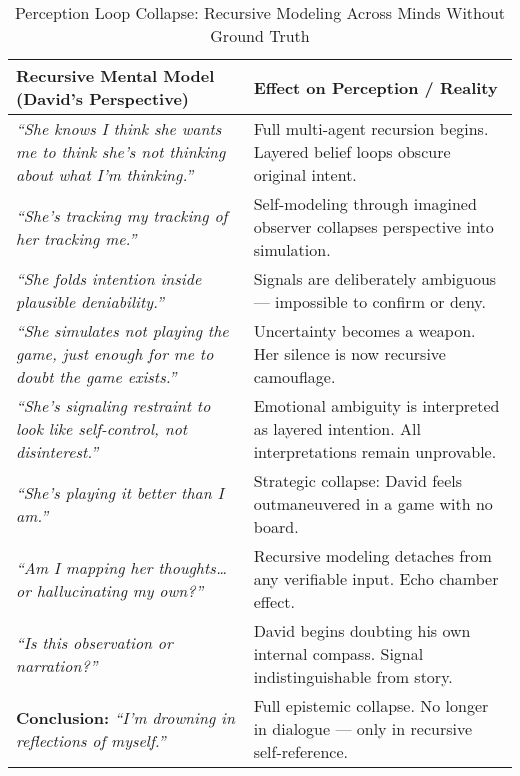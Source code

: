 \begin{table}[H]
  \centering
  \renewcommand{\arraystretch}{1.6}
  \begin{tabular}{>{\raggedright\arraybackslash}p{7cm} 
                  >{\raggedright\arraybackslash}p{7cm}}
  \toprule
  \textbf{Recursive Mental Model (David’s Perspective)} 
  & \textbf{Effect on Perception / Reality} \\
  \midrule

  \textit{“She knows I think she wants me to think she’s not thinking about what I’m thinking.”} 
  & Full multi-agent recursion begins. Layered belief loops obscure original intent. \\

  \textit{“She’s tracking my tracking of her tracking me.”} 
  & Self-modeling through imagined observer collapses perspective into simulation. \\

  \textit{“She folds intention inside plausible deniability.”} 
  & Signals are deliberately ambiguous — impossible to confirm or deny. \\

  \textit{“She simulates not playing the game, just enough for me to doubt the game exists.”} 
  & Uncertainty becomes a weapon. Her silence is now recursive camouflage. \\

  \textit{“She’s signaling restraint to look like self-control, not disinterest.”} 
  & Emotional ambiguity is interpreted as layered intention. All interpretations remain unprovable. \\

  \textit{“She’s playing it better than I am.”} 
  & Strategic collapse: David feels outmaneuvered in a game with no board. \\

  \textit{“Am I mapping her thoughts… or hallucinating my own?”} 
  & Recursive modeling detaches from any verifiable input. Echo chamber effect. \\

  \textit{“Is this observation or narration?”} 
  & David begins doubting his own internal compass. Signal indistinguishable from story. \\

  \textbf{Conclusion:} \textit{“I’m drowning in reflections of myself.”} 
  & Full epistemic collapse. No longer in dialogue — only in recursive self-reference. \\

  \bottomrule
  \end{tabular}
  \caption{Perception Loop Collapse: Recursive Modeling Across Minds Without Ground Truth}
\end{table}





